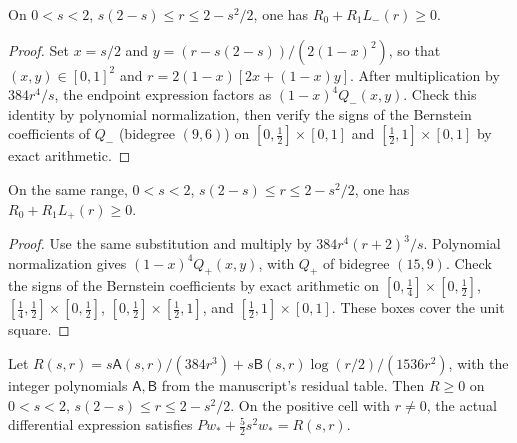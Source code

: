 \begin{lemma}
\label{cert:dd-residual-lower}
\leanok
On $0<s<2$, $s(2-s)\le r\le2-s^2/2$, one has $R_0+R_1 L_-(r)\ge0$.
\end{lemma}

\begin{proof}
\leanok
{}
Set $x=s/2$ and $y=(r-s(2-s))/(2(1-x)^2)$, so that
$(x,y)\in[0,1]^2$ and $r=2(1-x)[2x+(1-x)y]$.
After multiplication by $384r^4/s$, the endpoint expression factors as
$(1-x)^4 Q_-(x,y)$. Check this identity by polynomial normalization, then
verify the signs of the Bernstein coefficients of $Q_-$ (bidegree $(9,6)$)
on $[0,\frac12]\times[0,1]$ and $[\frac12,1]\times[0,1]$ by exact arithmetic.
\end{proof}

\begin{lemma}
\label{cert:dd-residual-upper}
\leanok
On the same range, $0<s<2$, $s(2-s)\le r\le2-s^2/2$, one has
$R_0+R_1 L_+(r)\ge0$.
\end{lemma}

\begin{proof}
\leanok
{}
Use the same substitution and multiply by $384r^4(r+2)^3/s$. Polynomial
normalization gives $(1-x)^4Q_+(x,y)$, with $Q_+$ of bidegree $(15,9)$.
Check the signs of the Bernstein coefficients by exact arithmetic on
$[0,\frac14]\times[0,\frac12]$, $[\frac14,\frac12]\times[0,\frac12]$,
$[0,\frac12]\times[\frac12,1]$, and $[\frac12,1]\times[0,1]$.
These boxes cover the unit square.
\end{proof}

\begin{lemma}
\label{cert:dd-residual}
\leanok
Let $R(s,r)=s\mathsf A(s,r)/(384r^3)
+s\mathsf B(s,r)\log(r/2)/(1536r^2)$, with the integer polynomials
$\mathsf A,\mathsf B$ from the manuscript's residual table.
Then $R\ge0$ on $0<s<2$, $s(2-s)\le r\le2-s^2/2$.
On the positive cell with $r\ne0$, the actual differential expression satisfies
$Pw_*+\tfrac52s^2w_*=R(s,r)$.
\end{lemma}

